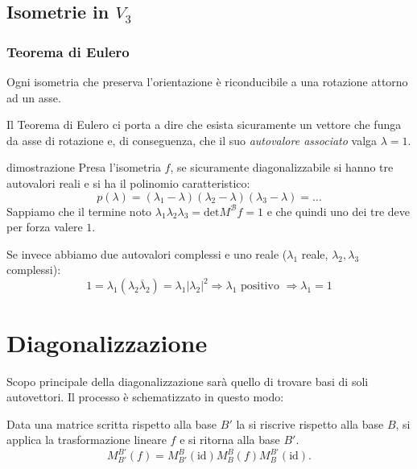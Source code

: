 \documentclass[x11names]{article}
\begin{document}
\subsection{Isometrie in $V_{3}$}
\begin{center}
	\colorbox{myred}{\begin{minipage}{5.75in}
			\begin{redes}{}
				\subsubsection{Teorema di Eulero}
				Ogni isometria che preserva l'orientazione è riconducibile a una rotazione attorno ad un asse.
			\end{redes}
	\end{minipage}}        
\end{center}

Il Teorema di Eulero ci porta a dire che esista sicuramente un vettore che funga da asse di rotazione e, di conseguenza, che il suo \textit{autovalore associato} valga $\lambda = 1$.

\begin{es}{dimostrazione}
	Presa l'isometria $f$, se sicuramente diagonalizzabile si hanno tre autovalori reali e si ha il polinomio caratteristico:
	\[
	p(\lambda) = (\lambda_1 - \lambda)(\lambda_2 - \lambda)(\lambda_3 -\lambda) = \dots
	\]
	Sappiamo che il termine noto $\lambda_1 \lambda_2 \lambda_{3} = \text{det}M^\mathcal{B}f = 1$ e che quindi uno dei tre deve per forza valere $1$. 
	
	Se invece abbiamo due autovalori complessi e uno reale ($\lambda_{1}$ reale, $\lambda_{2},\lambda_3$ complessi):
	\[
	1 = \lambda_{1}(\lambda_2 \overline{\lambda}_{2}) = \lambda_1 |\lambda_2|^2 \Longrightarrow \lambda_1 \text{ positivo } \Longrightarrow \lambda_{1} = 1
	\]
	
\end{es}

\newpage
\section{Diagonalizzazione}
Scopo principale della diagonalizzazione sarà quello di trovare basi di soli autovettori. Il processo è schematizzato in questo modo:
\begin{center}

\end{center}

\noindent
Data una matrice scritta rispetto alla base $B'$ la si riscrive rispetto alla base  $B$, si applica la trasformazione lineare  $f$ e si ritorna alla base  $B'$. 
 \[
 M^{B'}_{B'}\left(f\right) = M^{B}_{B'}\left(\text{id}\right) M^{B}_{B}\left(f\right) M^{B'}_{B}\left(\text{id}\right)
.\] 
\end{document}
